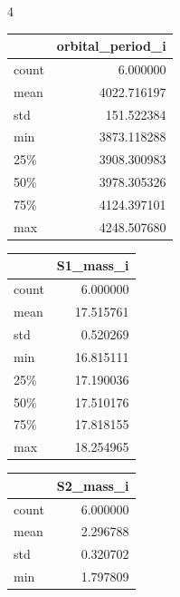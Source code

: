 \documentclass{article}
\begin{document}
\begin{multicols}{4}
\begin{tcolorbox}[sectionbox={Methods}, breakable=true]
    \begin{center}
        \begin{minipage}[t]{0.3\textwidth}
          \centering
          \begin{tabular}{|l|r|}
          \hline
          & orbital\_period\_i \\
          \hline
            count & 6.000000 \\
            mean & 4022.716197 \\
            std & 151.522384 \\
            min & 3873.118288 \\
            25\% & 3908.300983 \\
            50\% & 3978.305326 \\
            75\% & 4124.397101 \\
            max & 4248.507680 \\
          \hline
          \end{tabular}
        \end{minipage}
        \hfill
        \begin{minipage}[t]{0.3\textwidth}
          \centering
          \begin{tabular}{|l|r|}
          \hline
          & S1\_mass\_i \\
          \hline
            count & 6.000000 \\
            mean & 17.515761 \\
            std & 0.520269 \\
            min & 16.815111 \\
            25\% & 17.190036 \\
            50\% & 17.510176 \\
            75\% & 17.818155 \\
            max & 18.254965 \\
          \hline
          \end{tabular}
        \end{minipage}
        \hfill
        \begin{minipage}[t]{0.3\textwidth}
          \centering
          \begin{tabular}{|l|r|}
          \hline
          & S2\_mass\_i \\
          \hline
            count & 6.000000 \\
            mean & 2.296788 \\
            std & 0.320702 \\
            min & 1.797809 \\

\end{tabular}
\end{minipage}
\end{center}
\end{tcolorbox}
\end{multicols}
\end{document}

